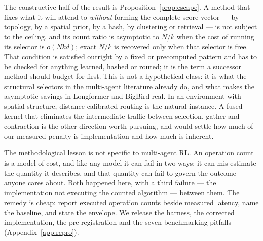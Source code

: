 The constructive half of the result is Proposition~\ref{prop:escape}. A method
that fixes what it will attend to \emph{without} forming the complete score
vector --- by topology, by a spatial prior, by a hash, by clustering or
retrieval --- is not subject to the ceiling, and its count ratio is asymptotic
to $N/k$ when the cost of running its selector is $o(Nkd)$; exact $N/k$ is
recovered only when that selector is free. That condition is satisfied outright
by a fixed or precomputed pattern and has to be checked for anything learned,
hashed or routed; it is the term a successor method should budget for first.
This is not a hypothetical class: it is what the structural
selectors in the multi-agent literature already do, and what makes the
asymptotic savings in Longformer and BigBird real. In an environment with
spatial structure, distance-calibrated routing is the natural instance. A fused
kernel that eliminates the intermediate traffic between selection, gather and
contraction is the other direction worth pursuing, and would settle how much of
our measured penalty is implementation and how much is inherent.

The methodological lesson is not specific to multi-agent RL. An operation count
is a model of cost, and like any model it can fail in two ways: it can
mis-estimate the quantity it describes, and that quantity can fail to govern
the outcome anyone cares about. Both happened here, with a third failure --- the
implementation not executing the counted algorithm --- between them. The remedy
is cheap: report executed operation counts beside measured latency, name the
baseline, and state the envelope. We release the harness, the corrected
implementation, the pre-registration and the seven benchmarking pitfalls
(Appendix~\ref{app:repro}).
